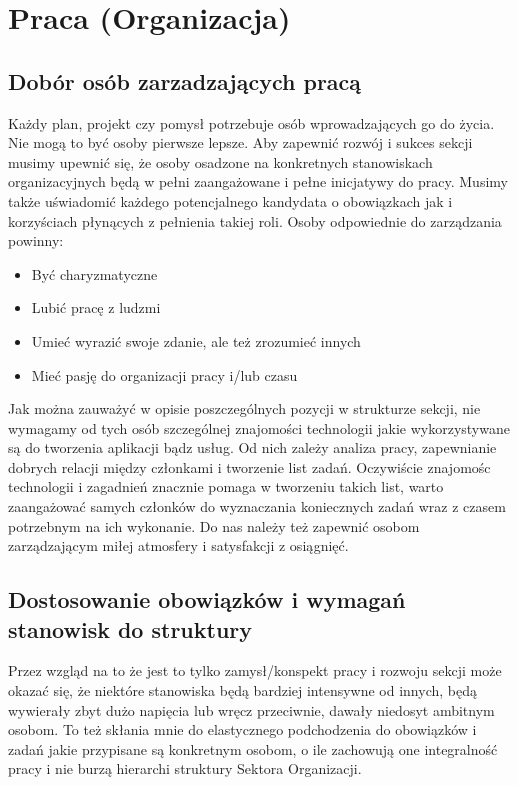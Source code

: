 \documentclass[9pt,a4paper]{report}
\begin{document}
\chapter{Praca (Organizacja)}

\section{Dobór osób zarzadzających pracą}

Każdy plan, projekt czy pomysł potrzebuje osób wprowadzających go do życia. Nie mogą to być osoby pierwsze lepsze. Aby zapewnić rozwój i sukces sekcji musimy upewnić się, że osoby osadzone na konkretnych stanowiskach organizacyjnych będą w pełni zaangażowane i pełne inicjatywy do pracy. Musimy także uświadomić każdego potencjalnego kandydata o obowiązkach jak i korzyściach płynących z pełnienia takiej roli. Osoby odpowiednie do zarządzania powinny:\\
\begin{itemize}
\item Być charyzmatyczne
\item Lubić pracę z ludzmi
\item Umieć wyrazić swoje zdanie, ale też zrozumieć innych
\item Mieć pasję do organizacji pracy i/lub czasu
\end{itemize}
Jak można zauważyć w opisie poszczególnych pozycji w strukturze sekcji, nie wymagamy od tych osób szczególnej znajomości technologii jakie wykorzystywane są do tworzenia aplikacji bądz usług. Od nich zależy analiza pracy, zapewnianie dobrych relacji między członkami i tworzenie list zadań. Oczywiście znajomośc technologii i zagadnień znacznie pomaga w tworzeniu takich list, warto zaangażować samych członków do wyznaczania koniecznych zadań wraz z czasem potrzebnym na ich wykonanie. Do nas należy też zapewnić osobom zarządzającym miłej atmosfery i satysfakcji z osiągnięć.

\section{Dostosowanie obowiązków i wymagań stanowisk do struktury}

Przez wzgląd na to że jest to tylko zamysł/konspekt pracy i rozwoju sekcji może okazać się, że niektóre stanowiska będą bardziej intensywne od innych, będą wywierały zbyt dużo napięcia lub wręcz przeciwnie, dawały niedosyt ambitnym osobom. To też skłania mnie do elastycznego podchodzenia do obowiązków i zadań jakie przypisane są konkretnym osobom, o ile zachowują one integralność pracy i nie burzą hierarchi struktury Sektora Organizacji.\\\\
\end{document}
